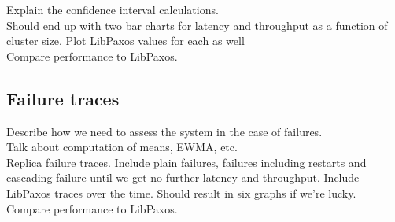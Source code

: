 Explain the confidence interval calculations. \\

{\color{blue}Should end up with two bar charts for latency and throughput as a function of cluster size. Plot LibPaxos values for each as well} \\

Compare performance to LibPaxos.

\subsection{Failure traces}

Describe how we need to assess the system in the case of failures. \\

Talk about computation of means, EWMA, etc. \\

{\color{blue}Replica failure traces. Include plain failures, failures including restarts and cascading failure until we get no further latency and throughput. Include LibPaxos traces over the time. Should result in six graphs if we're lucky.} \\

Compare performance to LibPaxos.




